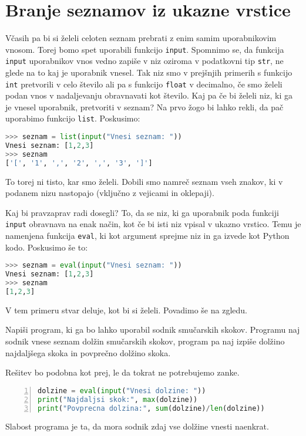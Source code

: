 \section{Branje seznamov iz ukazne vrstice}
Včasih pa bi si želeli celoten seznam prebrati z enim samim uporabnikovim vnosom. Torej bomo spet uporabili funkcijo \texttt{input}. Spomnimo se, da funkcija \texttt{input} uporabnikov vnos vedno zapiše v niz oziroma v podatkovni tip \texttt{str}, ne glede na to kaj je uporabnik vnesel. Tak niz smo v prejšnjih primerih s funkcijo \texttt{int} pretvorili v celo število ali pa s funkcijo \texttt{float} v decimalno, če smo želeli podan vnos v nadaljevanju obravnavati kot število. Kaj pa če bi želeli niz, ki ga je vnesel uporabnik, pretvoriti v seznam? Na prvo žogo bi lahko rekli, da pač uporabimo funkcijo \texttt{list}. Poskusimo:
\begin{lstlisting}[language=Python, showstringspaces=false]
>>> seznam = list(input("Vnesi seznam: "))
Vnesi seznam: [1,2,3]
>>> seznam
['[', '1', ',', '2', ',', '3', ']']
\end{lstlisting}
To torej ni tisto, kar smo želeli. Dobili smo namreč seznam vseh znakov, ki v podanem nizu nastopajo (vključno z vejicami in oklepaji).

Kaj bi pravzaprav radi dosegli? To, da se niz, ki ga uporabnik poda funkciji \texttt{input} obravnava na enak način, kot če bi isti niz vpisal v ukazno vrstico. Temu je namenjena funkcija \texttt{eval}, ki kot argument sprejme niz in ga izvede kot Python kodo. Poskusimo še to:
\begin{lstlisting}[language=Python, showstringspaces=false]
>>> seznam = eval(input("Vnesi seznam: "))
Vnesi seznam: [1,2,3]
>>> seznam
[1,2,3]
\end{lstlisting}
V tem primeru stvar deluje, kot bi si želeli. Povadimo še na zgledu.

\begin{zgled}
Napiši program, ki ga bo lahko uporabil sodnik smučarskih skokov. Programu naj sodnik vnese seznam dolžin smučarskih skokov, program pa naj izpiše dolžino najdaljšega skoka in povprečno dolžino skoka.
\end{zgled}
\begin{resitev}
Rešitev bo podobna kot prej, le da tokrat ne potrebujemo zanke.
\begin{lstlisting}[language=Python, showstringspaces=false,numbers=left]
dolzine = eval(input("Vnesi dolzine: "))
print("Najdaljsi skok:", max(dolzine))
print("Povprecna dolzina:", sum(dolzine)/len(dolzine))
\end{lstlisting}
Slabost programa je ta, da mora sodnik zdaj vse dolžine vnesti naenkrat. 
\end{resitev}

